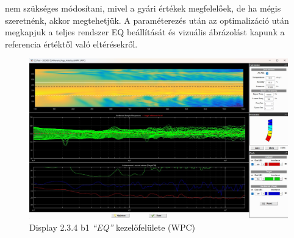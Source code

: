nem szükséges módosítani, mivel a gyári értékek megfelelőek, de ha mégis szeretnénk, akkor megtehetjük.
A paraméterezés után az optimalizáció után megkapjuk a teljes rendszer EQ beállítását és vizuális ábrázolást kapunk 
a referencia értéktől való eltérésekről.
\begin{figure}[H]
	\centering
	\includegraphics[width=\textwidth, keepaspectratio]{figures/display_wpc_5.jpg}
	\caption{Display 2.3.4 b1 \textit{``EQ''} kezelőfelülete (WPC)}\label{fig:display_wpc_5}
\end{figure}
